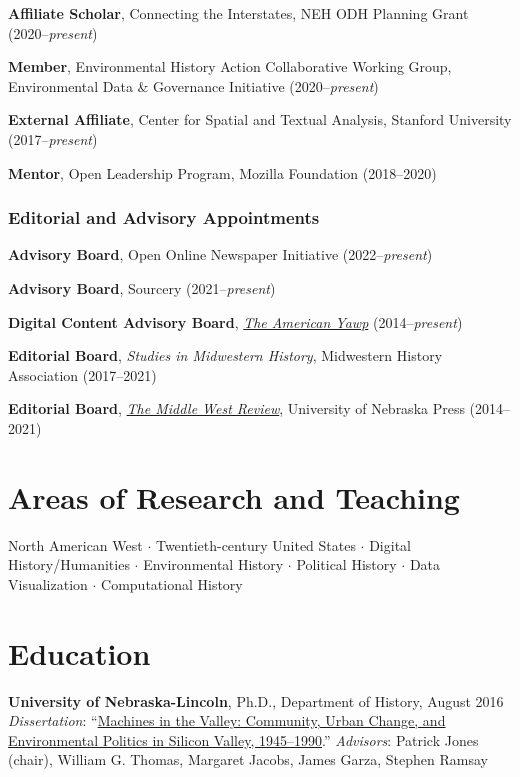 \textbf{Affiliate Scholar}, Connecting the Interstates, NEH ODH Planning
Grant (2020--\emph{present})

\textbf{Member}, Environmental History Action Collaborative Working
Group, Environmental Data \& Governance Initiative
(2020--\emph{present})

\textbf{External Affiliate}, Center for Spatial and Textual Analysis,
Stanford University (2017--\emph{present})

\textbf{Mentor}, Open Leadership Program, Mozilla Foundation
(2018--2020) \vspace{0.2cm}

\hypertarget{editorial-and-advisory-appointments}{%
\subsubsection{Editorial and Advisory
Appointments}\label{editorial-and-advisory-appointments}}

\textbf{Advisory Board}, Open Online Newspaper Initiative
(2022--\emph{present})

\textbf{Advisory Board}, Sourcery (2021--\emph{present})

\textbf{Digital Content Advisory Board},
\emph{\href{http://www.americanyawp.com/}{The American Yawp}}
(2014--\emph{present})

\textbf{Editorial Board}, \emph{Studies in Midwestern History},
Midwestern History Association (2017--2021)

\textbf{Editorial Board},
\emph{\href{https://uimiddle.wordpress.com/}{The Middle West Review}},
University of Nebraska Press (2014--2021)

\hypertarget{areas-of-research-and-teaching}{%
\section{Areas of Research and
Teaching}\label{areas-of-research-and-teaching}}

North American West \(\cdot\) Twentieth-century United States \(\cdot\)
Digital History/Humanities \(\cdot\) Environmental History \(\cdot\)
Political History \(\cdot\) Data Visualization \(\cdot\) Computational
History

\hypertarget{education}{%
\section{Education}\label{education}}

\textbf{University of Nebraska-Lincoln}, Ph.D., Department of History,
August 2016\\
\emph{Dissertation}:
``\href{http://digitalcommons.unl.edu/historydiss/86/}{Machines in the
Valley: Community, Urban Change, and Environmental Politics in Silicon
Valley, 1945--1990}.'' \emph{Advisors}: Patrick Jones (chair), William
G. Thomas, Margaret Jacobs, James Garza, Stephen Ramsay

